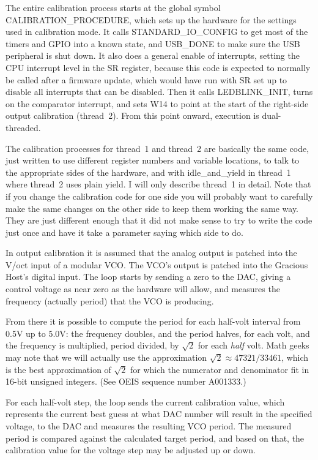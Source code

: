 The entire calibration process starts at the global symbol
CALIBRATION\_PROCEDURE, which sets up the hardware for the settings used in
calibration mode.  It calls STANDARD\_IO\_CONFIG to get most of the timers
and GPIO into a known state, and USB\_DONE to make sure the USB peripheral
is shut down.  It also does a general enable of interrupts, setting the CPU
interrupt level in the SR register, because this code is expected to
normally be called after a firmware update, which would have run with SR set
up to disable all interrupts that can be disabled.  Then it calls
LEDBLINK\_INIT, turns on the comparator interrupt, and sets W14 to point at
the start of the right-side output calibration (thread~2).  From this
point onward, execution is dual-threaded.

The calibration processes for thread~1 and thread~2 are basically the
same code, just written to use different register numbers and variable
locations, to talk to the appropriate sides of the hardware, and with
idle\_and\_yield in thread~1 where thread~2 uses plain yield.  I will only
describe thread~1 in detail.  Note that if you change the calibration code
for one side you will probably want to carefully make the same changes on
the other side to keep them working the same way.  They are just different
enough that it did not make sense to try to write the code just once and
have it take a parameter saying which side to do.

In output calibration it is assumed that the analog output is patched into
the V/oct input of a modular VCO.  The VCO's output is patched into the
Gracious Host's digital input.  The loop starts by sending a zero to the
DAC, giving a control voltage as near zero as the hardware will allow, and
measures the frequency (actually period) that the VCO is producing.

From there it is possible to compute the period for each half-volt interval
from 0.5V up to 5.0V: the frequency doubles, and the period halves, for each
volt, and the frequency is multiplied, period divided, by $\sqrt{2}$ for
each \emph{half} volt.  Math geeks may note that we will actually use the
approximation $\sqrt{2}\approx 47321/33461$, which is the best approximation
of $\sqrt{2}$ for which the numerator and denominator fit in 16-bit unsigned
integers.  (See OEIS sequence number A001333.)

For each half-volt step, the loop sends the current calibration value, which
represents the current best guess at what DAC number will result in the
specified voltage, to the DAC and measures the resulting VCO period.  The
measured period is compared against the calculated target period, and
based on that, the calibration value for the voltage step may be adjusted up
or down.

